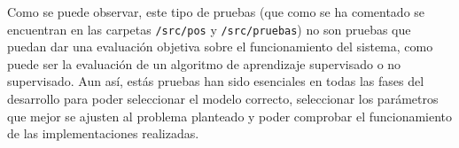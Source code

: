 Como se puede observar, este tipo de pruebas (que como se ha comentado se encuentran en las carpetas \texttt{/src/pos} y \texttt{/src/pruebas}) no son pruebas que puedan dar una evaluación objetiva sobre el funcionamiento del sistema, como puede ser la evaluación de un algoritmo de aprendizaje supervisado o no supervisado. Aun así, estás pruebas han sido esenciales en todas las fases del desarrollo para poder seleccionar el modelo correcto, seleccionar los parámetros que mejor se ajusten al problema planteado y poder comprobar el funcionamiento de las implementaciones realizadas.

